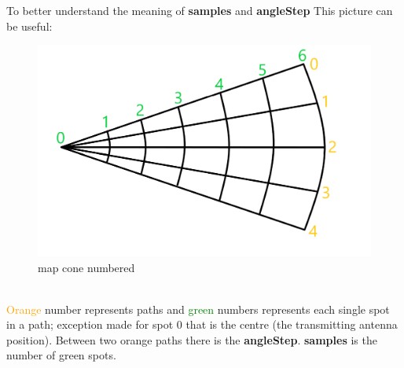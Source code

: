 \documentclass[peerreview]{IEEEtran}
\begin{document}
To better understand the meaning of \textbf{samples} and \textbf{angleStep} This picture can be useful:
\begin{figure}[!ht]
\centering
\includegraphics[width=0.85\columnwidth]{coneWithNumbers} 
\caption{map cone numbered}
\label{fig_coneWithNumbers}
\end{figure}
\\\textcolor{orange}{Orange} number represents paths and \textcolor{green}{green} numbers represents each single spot in a path; exception made for spot 0 that is the centre (the transmitting antenna position). Between two orange paths there is the \textbf{angleStep}.
\textbf{samples} is the number of green spots.
\end{document}
